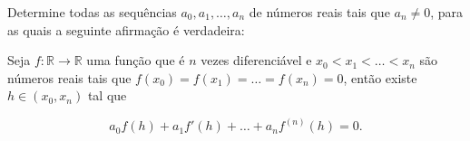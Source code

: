 Determine todas as sequências \(a_{0}, a_{1},\ldots, a_{n}\) de números reais tais que \(a_{n}\neq 0\), para as quais a seguinte afirmação é verdadeira:

Seja \(f\colon  \mathbb{R}\to\mathbb{R}\) uma função que é \(n\) vezes diferenciável e \(x_{0}<x_{1}<\ldots <x_{n}\) são números reais tais que \(f(x_{0})=f(x_{1})=\ldots =f(x_{n})=0\), então existe \(h\in (x_{0}, x_{n})\) tal que 

\[
a_{0}f(h)+a_{1}f'(h)+\ldots+a_{n}f^{(n)}(h)=0.
\]
